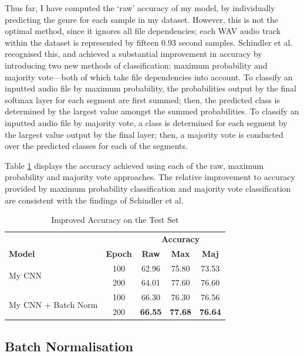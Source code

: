 \documentclass[conference]{IEEEtran}
\begin{document}
Thus far, I have computed the `raw' accuracy of my model, by individually predicting the genre for each sample in my dataset.
However, this is not the optimal method, since it ignores all file dependencies; each WAV audio track within the dataset is represented by fifteen 0.93 second samples.
Schindler et al. recognised this, and achieved a substantial improvement in accuracy by introducing two new methods of classification: maximum probability and majority vote---both of which take file dependencies into account.
To classify an inputted audio file by maximum probability, the probabilities output by the final softmax layer for each segment are first summed; then, the predicted class is determined by the largest value amongst the summed probabilities.
To classify an inputted audio file by majority vote, a class is determined for each segment by the largest value output by the final layer; then, a majority vote is conducted over the predicted classes for each of the segments.

Table \ref{improved_results} displays the accuracy achieved using each of the raw, maximum probability and majority vote approaches.
The relative improvement to accuracy provided by maximum probability classification and majority vote classification are consistent with the findings of Schindler et al.

\begin{table}[htbp]
    \caption{Improved Accuracy on the Test Set}
    \begin{center}
    \begin{tabular}{l c c c c}
    \toprule
    &&\multicolumn{3}{c}{\textbf{Accuracy}}\\
    \cmidrule(lr){3-5}
    \textbf{Model}&\textbf{Epoch}&\textbf{Raw}&\textbf{Max}&\textbf{Maj}\\
    \midrule
    \multirow{ 2}{*}{My CNN} & 100 & 62.96 & 75.80 & 73.53 \\
    & 200 & 64.01 & 77.60 & 76.60 \\
    \midrule
    \multirow{ 2}{*}{My CNN + Batch Norm} & 100 & 66.30 & 76.30 & 76.56 \\
    & 200 & \textbf{66.55} & \textbf{77.68} & \textbf{76.64} \\
    \bottomrule
    \end{tabular}
    \label{improved_results}
    \end{center}
\end{table}

\subsection{Batch Normalisation}
\end{document}
